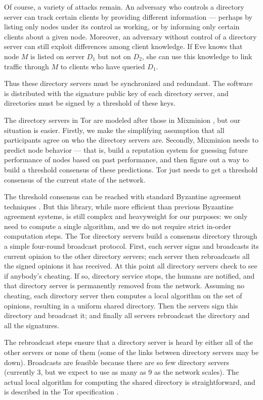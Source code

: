 \documentclass[times,10pt,twocolumn]{article}
\begin{document}
Of course, a variety of attacks remain. An adversary who controls a
directory server can track certain clients by providing different
information --- perhaps by listing only nodes under its control
as working, or by informing only certain clients about a given
node. Moreover, an adversary without control of a directory server can
still exploit differences among client knowledge. If Eve knows that
node $M$ is listed on server $D_1$ but not on $D_2$, she can use this
knowledge to link traffic through $M$ to clients who have queried $D_1$.

Thus these directory servers must be synchronized and redundant. The
software is distributed with the signature public key of each directory
server, and directories must be signed by a threshold of these keys.

The directory servers in Tor are modeled after those in Mixminion
\cite{minion-design}, but our situation is easier. Firstly, we make the
simplifying assumption that all participants agree on who the directory
servers are. Secondly, Mixminion needs to predict node behavior ---
that is, build a reputation system for guessing future performance of
nodes based on past performance, and then figure out a way to build
a threshold consensus of these predictions. Tor just needs to get a
threshold consensus of the current state of the network.

The threshold consensus can be reached with standard Byzantine agreement
techniques \cite{castro-liskov}.
But this library, while more efficient than previous Byzantine agreement
systems, is still complex and heavyweight for our purposes: we only need
to compute a single algorithm, and we do not require strict in-order
computation steps. The Tor directory servers build a consensus directory
through a simple four-round broadcast protocol. First, each server signs
and broadcasts its current opinion to the other directory servers; each
server then rebroadcasts all the signed opinions it has received. At this
point all directory servers check to see if anybody's cheating. If so,
directory service stops, the humans are notified, and that directory
server is permanently removed from the network. Assuming no cheating,
each directory server then computes a local algorithm on the set of
opinions, resulting in a uniform shared directory. Then the servers sign
this directory and broadcast it; and finally all servers rebroadcast
the directory and all the signatures.

The rebroadcast steps ensure that a directory server is heard by either
all of the other servers or none of them (some of the links between
directory servers may be down). Broadcasts are feasible because there
are so few directory servers (currently 3, but we expect to use as many
as 9 as the network scales). The actual local algorithm for computing
the shared directory is straightforward, and is described in the Tor
specification \cite{tor-spec}.
\end{document}
